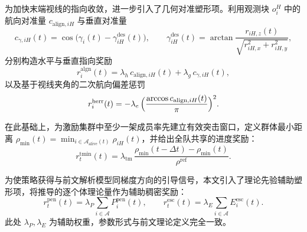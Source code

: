 为加快末端视线的指向收敛，进一步引入了几何对准塑形项。利用观测块 $o_i^{H}$ 中的航向对准量 $c_{\mathrm{align},iH}$ 与垂直对准量
\begin{equation}
c_{\gamma,iH}(t)=\cos\!\bigl(\gamma_i(t)-\gamma_{iH}^{\mathrm{des}}(t)\bigr),\qquad
\gamma_{iH}^{\mathrm{des}}(t)=\arctan\!\frac{r_{iH,z}(t)}{\sqrt{r_{iH,x}^{2}+r_{iH,y}^{2}}},
\end{equation}
分别构造水平与垂直指向奖励
\begin{equation}
r_i^{\mathrm{algn}}(t)=\lambda_h\,c_{\mathrm{align},iH}(t)+\lambda_g\,c_{\gamma,iH}(t),
\label{eq:r-align}
\end{equation}
以及基于视线夹角的二次航向偏差惩罚
\begin{equation}
r_i^{\mathrm{herr}}(t)=-\lambda_e\,\Bigl(\dfrac{\arccos c_{\mathrm{align},iH}(t)}{\pi}\Bigr)^{2}.
\label{eq:r-herr}
\end{equation}

在此基础上，为激励集群中至少一架成员率先建立有效突击窗口，定义群体最小距离 $\rho_{\min}(t)=\min_{i\in\mathcal{A}_{\mathrm{alive}}(t)}\rho_{iH}(t)$，并给出全队共享的进度奖励：
\begin{equation}
r_t^{\mathrm{tmin}}(t)=\lambda_{\mathrm{tm}}\,\frac{\rho_{\min}(t-\Delta t)-\rho_{\min}(t)}{\rho^{\mathrm{ref}}}.
\label{eq:r-team}
\end{equation}

为使策略获得与前文解析模型同梯度方向的引导信号，本文引入了理论先验辅助塑形项，将推导的逐个体理论量作为辅助稠密奖励：
\begin{equation}
r_t^{\mathrm{pen}}(t)=\lambda_P\sum_{i\in\mathcal{A}}P_i^{\mathrm{pen}}(t),\qquad
r_t^{\mathrm{esc}}(t)=\lambda_E\sum_{i\in\mathcal{A}}E_i^{\mathrm{esc}}(t).
\label{eq:r-prior}
\end{equation}
此处 $\lambda_P,\lambda_E$ 为辅助权重，参数形式与前文理论定义完全一致。

